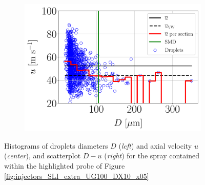 \begin{figure}[h!]
\begin{subfigure}[b]{0.3\textwidth}
	\centering
   \includegraphics[scale=0.24]{./part2_developments/figures_ch5_resolved_JICF/injectors_SLI_extra/uG100_dx10_x05_vel_scatter}
\end{subfigure}

\caption[Histograms of droplets diameters $D$ (\textsl{left}) and axial velocity $u$ (\textsl{center}), and scatterplot $D - u$ (\textsl{right})]{Histograms of droplets diameters $D$ (\textsl{left}) and axial velocity $u$ (\textsl{center}), and scatterplot $D - u$ (\textsl{right}) for the spray contained within the highlighted probe of Figure \ref{fig:injectors_SLI_extra_UG100_DX10_x05}}
\label{fig:injectors_extra_velocities_interesting}
\end{figure}




